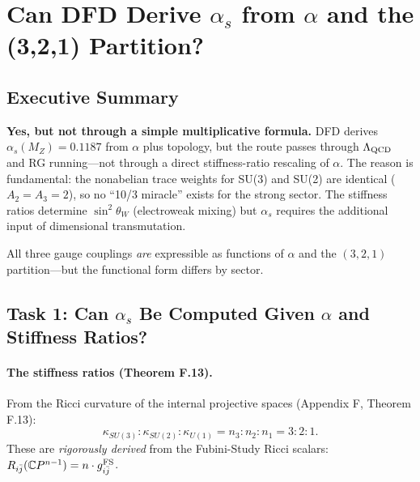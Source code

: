 
\section{Can DFD Derive $\alpha_s$ from $\alpha$ and the (3,2,1) Partition?}

\subsection{Executive Summary}

\textbf{Yes, but not through a simple multiplicative formula.}
DFD derives $\alpha_s(M_Z) = 0.1187$ from $\alpha$ plus topology, but the route passes
through $\Lambda_{\rm QCD}$ and RG running---not through a direct stiffness-ratio rescaling
of $\alpha$. The reason is fundamental: the nonabelian trace weights for SU(3) and SU(2)
are identical ($A_2 = A_3 = 2$), so no ``10/3 miracle'' exists for the strong sector.
The stiffness ratios determine $\sin^2\theta_W$ (electroweak mixing) but $\alpha_s$
requires the additional input of dimensional transmutation.

All three gauge couplings \emph{are} expressible as functions of $\alpha$ and the
$(3,2,1)$ partition---but the functional form differs by sector.

\subsection{Task 1: Can $\alpha_s$ Be Computed Given $\alpha$ and Stiffness Ratios?}

\paragraph{The stiffness ratios (Theorem F.13).}
From the Ricci curvature of the internal projective spaces (Appendix F, Theorem F.13):
\begin{equation}
\kappa_{SU(3)} : \kappa_{SU(2)} : \kappa_{U(1)} = n_3 : n_2 : n_1 = 3 : 2 : 1.
\end{equation}
These are \emph{rigorously derived} from the Fubini-Study Ricci scalars:
$R_{i\bar{j}}(\mathbb{C}P^{n-1}) = n \cdot g^{\rm FS}_{i\bar{j}}$.

